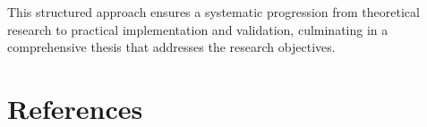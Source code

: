 \documentclass[ a4paper,
                toc=bibliography
              ]{scrartcl}
\begin{document}
This structured approach ensures a systematic progression from theoretical research to practical implementation and validation, culminating in a comprehensive thesis that addresses the research objectives.

\section{References}

\printbibliography
\end{document}
